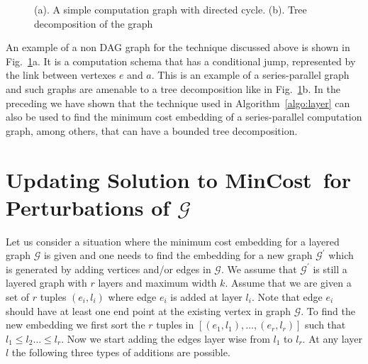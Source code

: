 \documentclass[journal]{IEEEtran}
\newcommand{\compgraph}{\mathcal{G}}
\newcommand{\mincost}{\textsf{MinCost}}
\begin{document}
\begin{figure}[tbp]
\centering
{}
\hspace*{10pt}
 \caption{(a). A simple computation graph with directed
    cycle. (b). Tree decomposition of the graph}
  \label{fig:series}
\end{figure}

An example of a non DAG graph for the technique discussed above is
shown in Fig.~\ref{fig:series}a. It is a computation
schema that has a conditional jump, represented by the link between
vertexes $e$ and $a$. This is an example of a series-parallel graph
\cite{Diestel00} and such graphs are amenable to a tree decomposition
like in Fig.~\ref{fig:series}b.  In the preceding we have shown that
the technique used in Algorithm~\ref{algo:layer} can also be used to
find the minimum cost embedding of a series-parallel computation
graph, among others, that can have a bounded tree decomposition.

\section{Updating Solution to \mincost\ for Perturbations of $\compgraph$}
\label{sec:change_computation}

Let us consider a situation where the minimum cost embedding for a
layered graph $\compgraph$ is given and one needs to find the
embedding for a new graph $\compgraph^{\prime}$ which is generated by
adding vertices and/or edges in $\compgraph.$ We assume that
$\compgraph^{\prime}$ is still a layered graph with $r$ layers and
maximum width $k.$ Assume that we are given a set of $r$ tuples
$(e_i,l_i)$ where edge $e_i$ is added at layer $l_i.$ Note that edge
$e_i$ should have at least one end point at the existing vertex in
graph $\compgraph.$ To find the new embedding we first sort the $r$
tuples in $[(e_1,l_1),\ldots,(e_r,l_r)]$ such that $l_1 \leq l_2
\ldots \leq l_r.$ Now we start adding the edges layer wise from $l_1$
to $l_r.$ At any layer $l$ the following three types of additions are
possible.
\end{document}
